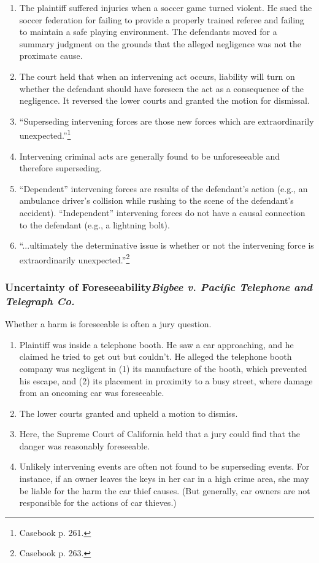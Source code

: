 \begin{enumerate}
    \item The plaintiff suffered injuries when a soccer game turned violent. 
    He sued the soccer federation for failing to provide a properly trained 
    referee and failing to maintain a safe playing environment. The defendants 
    moved for a summary judgment on the grounds that the alleged negligence 
    was not the proximate cause.
    \item The court held that when an intervening act occurs, liability will 
    turn on whether the defendant should have foreseen the act as a 
    consequence of the negligence. It reversed the lower courts and granted 
    the motion for dismissal.
    \item ``Superseding intervening forces are those new forces which are 
    extraordinarily unexpected.''\footnote{Casebook p. 261.}
    \item Intervening criminal acts are generally found to be unforeseeable 
    and therefore superseding.
    \item ``Dependent'' intervening forces are results of the defendant's 
    action (e.g., an ambulance driver's collision while rushing to the scene 
    of the defendant's accident). ``Independent'' intervening forces do not 
    have a causal connection to the defendant (e.g., a lightning bolt).
    \item ``...ultimately the determinative issue is whether or not the 
    intervening force is extraordinarily unexpected.''\footnote{Casebook p. 
    263.}
\end{enumerate}

\subsubsection{Uncertainty of Foreseeability\emph{Bigbee v. Pacific Telephone and Telegraph Co.}}

Whether a harm is foreseeable is often a jury question.

\begin{enumerate}
    \item Plaintiff was inside a telephone booth. He saw a car approaching, 
    and he claimed he tried to get out but couldn't. He alleged the telephone 
    booth company was negligent in (1) its manufacture of the booth, which 
    prevented his escape, and (2) its placement in proximity to a busy street, 
    where damage from an oncoming car was foreseeable.
    \item The lower courts granted and upheld a motion to dismiss.
    \item Here, the Supreme Court of California held that a 
    jury could find that the danger was reasonably foreseeable.
    \item Unlikely intervening events are often not found to be superseding 
    events. For instance, if an owner leaves the keys in her car in a high 
    crime area, she may be liable for the harm the car thief causes. (But 
    generally, car owners are not responsible for the actions of car thieves.)
\end{enumerate}

